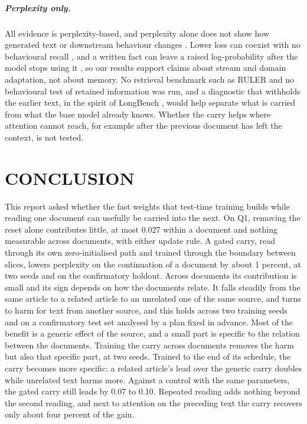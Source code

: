 \documentclass[12pt,a4paper]{report}
\begin{document}
\paragraph{Perplexity only.} All evidence is perplexity-based, and perplexity alone does not show how generated text or downstream behaviour changes \citep{meister2021beyond}. Lower loss can coexist with no behavioural recall \citep{song2026beyond}, and a written fact can leave a raised log-probability after the model stops using it \citep{oneill2026continually}, so our results support claims about stream and domain adaptation, not about memory. No retrieval benchmark such as RULER \citep{hsieh2024ruler} and no behavioural test of retained information was run, and a diagnostic that withholds the earlier text, in the spirit of LongBench \citep{bai2023longbench}, would help separate what is carried from what the base model already knows. Whether the carry helps where attention cannot reach, for example after the previous document has left the context, is not tested.

\chapter{CONCLUSION}
\label{ch-conclusion}

This report asked whether the fast weights that test-time training builds while reading one document can usefully be carried into the next. On Q1, removing the reset alone contributes little, at most 0.027 within a document and nothing measurable across documents, with either update rule. A gated carry, read through its own zero-initialised path and trained through the boundary between slices, lowers perplexity on the continuation of a document by about 1 percent, at two seeds and on the confirmatory holdout. Across documents its contribution is small and its sign depends on how the documents relate. It falls steadily from the same article to a related article to an unrelated one of the same source, and turns to harm for text from another source, and this holds across two training seeds and on a confirmatory test set analysed by a plan fixed in advance. Most of the benefit is a generic effect of the source, and a small part is specific to the relation between the documents. Training the carry across documents removes the harm but also that specific part, at two seeds. Trained to the end of its schedule, the carry becomes more specific: a related article's lead over the generic carry doubles while unrelated text harms more. Against a control with the same parameters, the gated carry still leads by 0.07 to 0.10. Repeated reading adds nothing beyond the second reading, and next to attention on the preceding text the carry recovers only about four percent of the gain.
\end{document}
